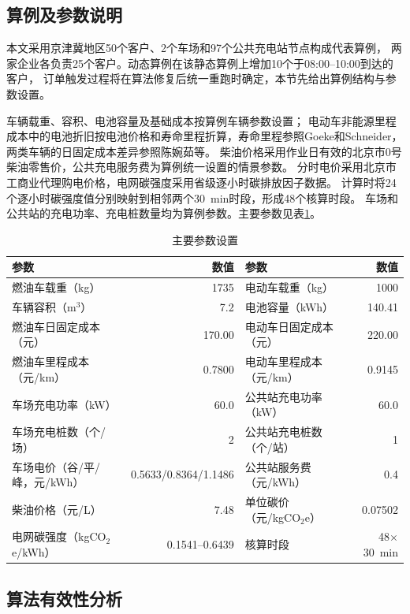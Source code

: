 \documentclass{setp-new}
\begin{document}
\subsection{算例及参数说明}

本文采用京津冀地区50个客户、2个车场和97个公共充电站节点构成代表算例，
两家企业各负责25个客户。动态算例在该静态算例上增加10个于08:00--10:00到达的客户，
订单触发过程将在算法修复后统一重跑时确定，本节先给出算例结构与参数设置。

车辆载重、容积、电池容量及基础成本按算例车辆参数设置；
电动车非能源里程成本中的电池折旧按电池价格和寿命里程折算，寿命里程参照Goeke和Schneider\cite{ref:27}，
两类车辆的日固定成本差异参照陈婉茹等\cite{ref:23}。
柴油价格采用作业日有效的北京市0号柴油零售价，公共充电服务费为算例统一设置的情景参数。
分时电价采用北京市工商业代理购电价格，电网碳强度采用省级逐小时碳排放因子数据\cite{ref:82}。
计算时将24个逐小时碳强度值分别映射到相邻两个30~min时段，形成48个核算时段。
车场和公共站的充电功率、充电桩数量均为算例参数。主要参数见表\ref{tab:parameters}。

\begin{table}[H]
  \centering
  \caption{主要参数设置}
  \label{tab:parameters}
  \scriptsize
  \begin{tabular*}{\textwidth}{@{\extracolsep{\fill}}lrlr}
    \toprule
    参数 & 数值 & 参数 & 数值\\
    \midrule
    燃油车载重（kg） & 1735 & 电动车载重（kg） & 1000\\
    车辆容积（m$^3$） & 7.2 & 电池容量（kWh） & 140.41\\
    燃油车日固定成本（元） & 170.00 & 电动车日固定成本（元） & 220.00\\
    燃油车里程成本（元/km） & 0.7800 & 电动车里程成本（元/km） & 0.9145\\
    车场充电功率（kW） & 60.0 & 公共站充电功率（kW） & 60.0\\
    车场充电桩数（个/场） & 2 & 公共站充电桩数（个/站） & 1\\
    车场电价（谷/平/峰，元/kWh） & 0.5633/0.8364/1.1486 & 公共站服务费（元/kWh） & 0.4\\
    柴油价格（元/L） & 7.48 & 单位碳价（元/kgCO$_2$e） & 0.07502\\
    电网碳强度（kgCO$_2$e/kWh） & 0.1541--0.6439 & 核算时段 & 48$\times$30~min\\
    \bottomrule
  \end{tabular*}
\end{table}

\subsection{算法有效性分析}
\end{document}
